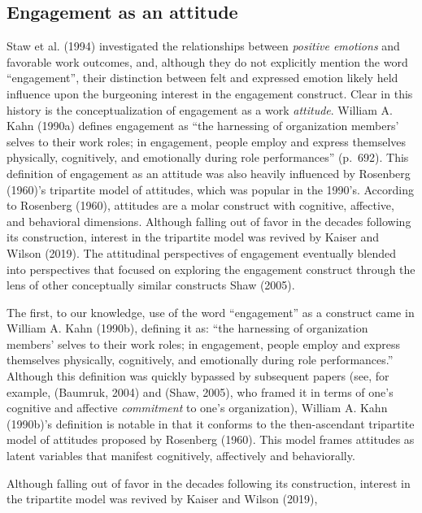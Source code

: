 \documentclass[
  man]{apa6}
\begin{document}
\hypertarget{engagement-as-an-attitude}{%
\subsection{Engagement as an attitude}\label{engagement-as-an-attitude}}

Staw et al. (1994) investigated the relationships between \emph{positive emotions} and favorable work outcomes, and, although they do not explicitly mention the word ``engagement'', their distinction between felt and expressed emotion likely held influence upon the burgeoning interest in the engagement construct. Clear in this history is the conceptualization of engagement as a work \emph{attitude}. William A. Kahn (1990a) defines engagement as ``the harnessing of organization members' selves to their work roles; in engagement, people employ and express themselves physically, cognitively, and emotionally during role performances'' (p.~692). This definition of engagement as an attitude was also heavily influenced by Rosenberg (1960)'s tripartite model of attitudes, which was popular in the 1990's. According to Rosenberg (1960), attitudes are a molar construct with cognitive, affective, and behavioral dimensions. Although falling out of favor in the decades following its construction, interest in the tripartite model was revived by Kaiser and Wilson (2019). The attitudinal perspectives of engagement eventually blended into perspectives that focused on exploring the engagement construct through the lens of other conceptually similar constructs Shaw (2005).

The first, to our knowledge, use of the word ``engagement'' as a construct came in William A. Kahn (1990b), defining it as: ``the harnessing of organization members' selves to their work roles; in engagement, people employ and express themselves physically, cognitively, and emotionally during role performances.'' Although this definition was quickly bypassed by subsequent papers (see, for example, (Baumruk, 2004) and (Shaw, 2005), who framed it in terms of one's cognitive and affective \emph{commitment} to one's organization), William A. Kahn (1990b)'s definition is notable in that it conforms to the then-ascendant tripartite model of attitudes proposed by Rosenberg (1960). This model frames attitudes as latent variables that manifest cognitively, affectively and behaviorally.

Although falling out of favor in the decades following its construction, interest in the tripartite model was revived by Kaiser and Wilson (2019),
\end{document}
